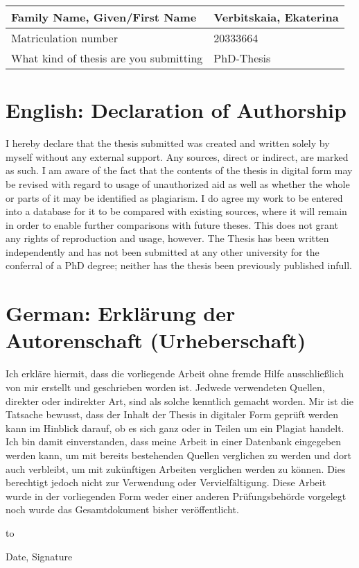 \documentclass[crop=false]{standalone}
\begin{document}
\begin{tabular}{| l | l |} 
  \hline
  Family Name, Given/First Name & Verbitskaia, Ekaterina \\ 
  \hline
  Matriculation number & 20333664 \\ 
  \hline
  What kind of thesis are you submitting & PhD‐Thesis \\
  \hline
 \end{tabular}

\vfill

\section*{English: Declaration of Authorship}

I hereby declare that the thesis submitted was created and written solely by myself
without any external support. Any sources, direct or indirect, are marked as such. I
am aware of the fact that the contents of the thesis in digital form may be revised with
regard to usage of unauthorized aid as well as whether the whole or parts of it may
be identified as plagiarism. I do agree my work to be entered into a database for it to
be compared with existing sources, where it will remain in order to enable further
comparisons with future theses. This does not grant any rights of reproduction and
usage, however.
The Thesis has been written independently and has not been submitted at any other
university for the conferral of a PhD degree; neither has the thesis been previously
published infull.


\section*{German: Erkl\"{a}rung der Autorenschaft (Urheberschaft)}

Ich erkl\"{a}re hiermit, dass die vorliegende Arbeit ohne fremde Hilfe ausschließlich von
mir erstellt und geschrieben worden ist. Jedwede verwendeten Quellen, direkter oder
indirekter Art, sind als solche kenntlich gemacht worden. Mir ist die Tatsache
bewusst, dass der Inhalt der Thesis in digitaler Form gepr\"{u}ft werden kann im Hinblick
darauf, ob es sich ganz oder in Teilen um ein Plagiat handelt. Ich bin damit
einverstanden, dass meine Arbeit in einer Datenbank eingegeben werden kann, um
mit bereits bestehenden Quellen verglichen zu werden und dort auch verbleibt, um
mit zuk\"{u}nftigen Arbeiten verglichen werden zu k\"{o}nnen. Dies berechtigt jedoch nicht
zur Verwendung oder Vervielf\"{a}ltigung.
Diese Arbeit wurde in der vorliegenden Form weder einer anderen Pr\"{u}fungsbeh\"{o}rde
vorgelegt noch wurde das Gesamtdokument bisher ver\"{o}ffentlicht.

\vfill

\hbox to 

\noindent
Date, Signature
\end{document}
